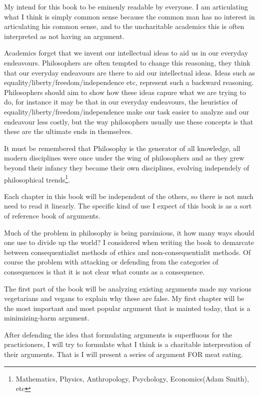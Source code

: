 My intend for this book to be eminenly readable by everyone. I am articulating what I think is simply common sense because the common man has no interest in articulating his common sense, and to the uncharitable academics this is often interpreted as not having an argument. 

Academics forget that we invent our intellectual ideas to aid us in our everyday endeavours. Philosophers are often tempted to change this reasoning, they think that our everyday endeavours are there to aid our intellectual ideas. Ideas such as equality/liberty/freedom/independence etc, represent such a backward reasoning. Philosophers should aim to show how these ideas capure what we are trying to do, for instance it may be that in our everyday endeavours, the heuristics of equality/liberty/freedom/independence make our task easier to analyze and our endeavour less costly, but the way philosophers usually use these concepts is that these are the ultimate ends in themselves. 


It must be remembered that Philosophy is the generator of all knowledge, all modern disciplines were once under the wing of philosophers and as they grew beyond their infancy they became their own disciplines, evolving independely of philosophical trends\footnote{Mathematics, Physics, Anthropology, Psychology, Economics(Adam Smith), etc}. 


Each chapter in this book will be independent of the others, so there is not much need to read it linearly. The specific kind of use I expect of this book is as a sort of reference book of arguments. 

Much of the problem in philosophy is being parsimious, it how many ways should one use to divide up the world? I considered when writing the book to demarcate between consequentialist methods of ethics and non-consequentialit methods. Of course the problem with attacking or defending from the categories of consequences is that it is not clear what counts as a consequence. 

The first part of the book will be analyzing existing arguments made my various vegetarians and vegans to explain why these are false. My first chapter will be the most important and most popular argument that is mainted today, that is a minimizing-harm argument. 

After defending the idea that formulating arguments is superfluous for the practicioners, I will try to formulate what I think is a charitable interpreation of their arguments. That is I will present a series of argument FOR meat eating. 

